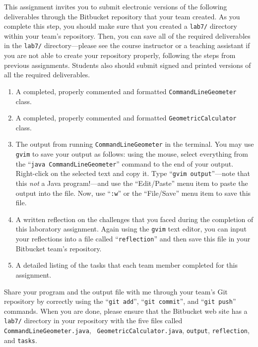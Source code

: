 This assignment invites you to submit electronic versions of the following deliverables through the Bitbucket repository
that your team created.  As you complete this step, you should make sure that you created a {\tt lab7/} directory within
your team's repository.  Then, you can save all of the required deliverables in the {\tt lab7/} directory---please see
the course instructor or a teaching assistant if you are not able to create your repository properly, following the steps
from previous assignments. Students also should submit signed and printed versions of all the required deliverables.

\vspace*{-.05in}
\begin{enumerate}
    \setlength{\itemsep}{0pt}

  \item A completed, properly commented and formatted {\tt CommandLineGeometer} class.

  \item A completed, properly commented and formatted {\tt GeometricCalculator} class.

  \item The output from running {\tt CommandLineGeometer} in the terminal. You may use {\tt gvim} to save
    your output as follows: using the mouse, select everything from the ``{\tt java CommandLineGeometer}'' command
    to the end of your output.  Right-click on the selected text and copy it.  Type ``{\tt gvim output}''---note
    that this {\em not} a Java program!---and use the ``Edit/Paste'' menu item to paste the output into the file.
    Now, use ``{\tt :w}'' or the ``File/Save'' menu item to save this file.

  \item A written reflection on the challenges that you faced during the completion of this laboratory assignment.
    Again using the {\tt gvim} text editor, you can input your reflections into a file called ``{\tt reflection}''
    and then save this file in your Bitbucket team's repository.

  \item A detailed listing of the tasks that each team member completed for this assignment.

\end{enumerate}
\vspace*{-.1in}

Share your program and the output file with me through your team's Git repository by correctly using the ``{\tt git
add}'', ``{\tt git commit}'', and ``{\tt git push}'' commands. When you are done, please ensure that the Bitbucket web
site has a {\tt lab7/} directory in your repository with the five files called {\tt CommandLineGeometer.java}, {\tt
GeometricCalculator.java}, {\tt output}, {\tt reflection}, and {\tt tasks}.

